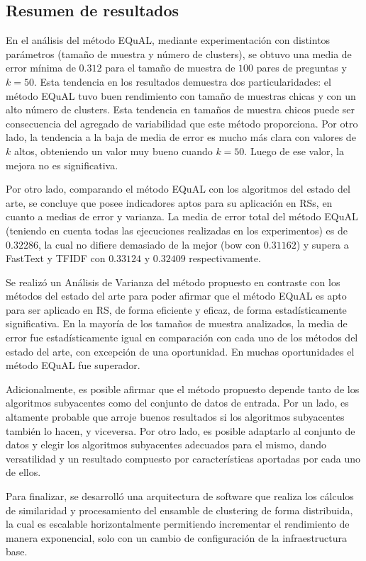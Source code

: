 \subsection{Resumen de resultados}

En el análisis del método EQuAL, mediante experimentación con distintos parámetros (tamaño de muestra y número de clusters), se obtuvo una media de error mínima de \(0.312\) para el tamaño de muestra de \(100\) pares de preguntas y \(k = 50\). Esta tendencia en los resultados demuestra dos particularidades: el método EQuAL tuvo buen rendimiento con tamaño de muestras chicas y con un alto número de clusters. Esta tendencia en tamaños de muestra chicos puede ser consecuencia del agregado de variabilidad que este método proporciona. Por otro lado, la tendencia a la baja de media de error es mucho más clara con valores de \(k\) altos, obteniendo un valor muy bueno cuando \(k = 50\). Luego de ese valor, la mejora no es significativa.

\bigskip Por otro lado, comparando el método EQuAL con los algoritmos del estado del arte, se concluye que posee indicadores aptos para su aplicación en RSs, en cuanto a medias de error y varianza. La media de error total del método EQuAL (teniendo en cuenta todas las ejecuciones realizadas en los experimentos) es de \(0.32286\), la cual no difiere demasiado de la mejor (bow con \(0.31162\)) y supera a FastText y TFIDF con \(0.33124\) y \(0.32409\) respectivamente.

\bigskip Se realizó un Análisis de Varianza del método propuesto en contraste con los métodos del estado del arte para poder afirmar que el método EQuAL es apto para ser aplicado en RS, de forma eficiente y eficaz, de forma estadísticamente significativa. En la mayoría de los tamaños de muestra analizados, la media de error fue estadísticamente igual en comparación con cada uno de los métodos del estado del arte, con excepción de una oportunidad. En muchas oportunidades el método EQuAL fue superador.

\bigskip Adicionalmente, es posible afirmar que el método propuesto depende tanto de los algoritmos subyacentes como del conjunto de datos de entrada. Por un lado, es altamente probable que arroje buenos resultados si los algoritmos subyacentes también lo hacen, y viceversa. Por otro lado, es posible adaptarlo al conjunto de datos y elegir los algoritmos subyacentes adecuados para el mismo, dando versatilidad y un resultado compuesto por características aportadas por cada uno de ellos.

\bigskip Para finalizar, se desarrolló una arquitectura de software que realiza los cálculos de similaridad y procesamiento del ensamble de clustering de forma distribuida, la cual es escalable horizontalmente permitiendo incrementar el rendimiento de manera exponencial, solo con un cambio de configuración de la infraestructura base.
